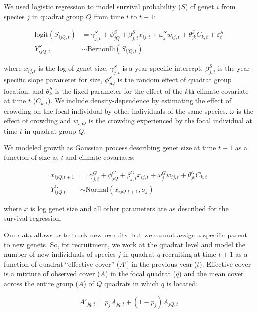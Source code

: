 \documentclass[12pt,]{article}
\begin{document}
We used logistic regression to model survival probability ($S$) of genet
$i$ from species $j$ in quadrat group $Q$ from time $t$ to $t+1$:

\begin{align}
\text{logit}(S_{ijQ,t}) &= \gamma^{S}_{j,t} + \phi^{S}_{jQ} + \beta^{S}_{j,t}x_{ij,t} + \omega^{S}_{j}w_{ij,t} + \theta^{S}_{jk}C_{k,t} + \varepsilon^{S}_{t} \\
Y^{S}_{ijQ,t} &\sim \text{Bernoulli}(S_{ijQ,t})
\end{align}

where $x_{ij,t}$ is the log of genet size, $\gamma^{S}_{j,t}$ is a
year-specific intercept, $\beta^{S}_{j,t}$ is the year-specific slope
parameter for size, $\phi^{S}_{jQ}$ is the random effect of quadrat
group location, and $\theta^{S}_{k}$ is the fixed parameter for the
effect of the $k$th climate covariate at time $t$ ($C_{k,t}$). We
include density-dependence by estimating the effect of crowding on the
focal individual by other individuals of the same species. $\omega$ is
the effect of crowding and $w_{t,Q}$ is the crowding experienced by the
focal individual at time $t$ in quadrat group $Q$.

We modeled growth as Gaussian process describing genet size at time
$t+1$ as a function of size at $t$ and climate covariates:

\begin{align}
x_{ijQ,t+1} &= \gamma^{G}_{j,t} + \phi^{G}_{jQ} + \beta^{G}_{j,t}x_{ij,t} + \omega^{G}_{j}w_{ij,t} + \theta^{G}_{jk}C_{k,t} \\
Y^{G}_{ijQ,t} &\sim \text{Normal}(x_{ijQ,t+1}, \sigma_{j})
\end{align}

where $x$ is log genet size and all other parameters are as described
for the survival regression.

Our data allows us to track new recruits, but we cannot assign a
specific parent to new genets. So, for recruitment, we work at the
quadrat level and model the number of new individuals of species $j$ in
quadrat $q$ recruiting at time $t+1$ as a function of quadrat
``effective cover'' ($A'$) in the previous year ($t$). Effective cover
is a mixture of observed cover ($A$) in the focal quadrat ($q$) and the
mean cover across the entire group ($\bar{A}$) of $Q$ quadrats in which
$q$ is located:

\begin{equation}
A'_{jq,t} = p_{j}A_{jq,t} + (1-p_{j})\bar{A}_{jQ,t}
\end{equation}
\end{document}
